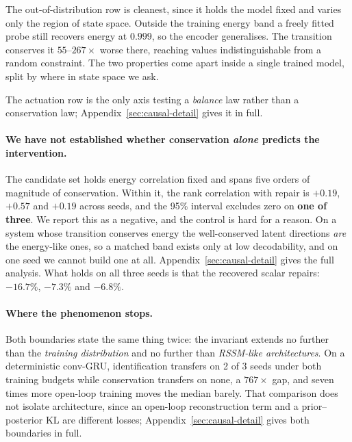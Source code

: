 The out-of-distribution row is cleanest, since it holds the model fixed and varies only the region
of state space. Outside the training energy band a freely fitted probe still recovers energy at
$0.999$, so the encoder generalises. The transition conserves it $55$--$267\times$ worse there, reaching
values indistinguishable from a random constraint. The two properties come apart inside a single
trained model, split by where in state space we ask.

The actuation row is the only axis testing a \emph{balance} law rather than a conservation law;
Appendix~\ref{sec:causal-detail} gives it in full.

\paragraph{We have not established whether conservation \emph{alone} predicts the intervention.}
The candidate set holds energy correlation fixed and spans five orders of magnitude of conservation.
Within it, the rank correlation with repair is $+0.19$, $+0.57$ and $+0.19$ across seeds, and the
95\% interval excludes zero on \textbf{one of three}. We report this as a negative, and the control
is hard for a reason. On a system whose transition conserves energy the well-conserved latent
directions \emph{are} the energy-like ones, so a matched band exists only at low decodability, and on
one seed we cannot build one at all. Appendix~\ref{sec:causal-detail} gives the full analysis. What
holds on all three seeds is that the recovered scalar repairs: $-16.7\%$, $-7.3\%$ and $-6.8\%$.

\paragraph{Where the phenomenon stops.}
Both boundaries state the same thing twice: the invariant extends no further than the \emph{training
distribution} and no further than \emph{RSSM-like architectures}. On a deterministic conv-GRU,
identification transfers on 2 of 3 seeds under both training budgets while conservation transfers on
none, a $767\times$ gap, and seven times more open-loop training moves the median barely. That
comparison does not isolate architecture, since an open-loop reconstruction term and a
prior--posterior KL are different losses; Appendix~\ref{sec:causal-detail} gives both boundaries in
full.
